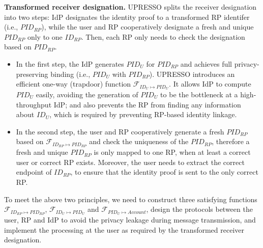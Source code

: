 \vspace{1mm}\noindent \textbf{Transformed receiver designation.}
UPRESSO splits the receiver designation into two steps: IdP designates the identity proof to a transformed RP identifer (i.e., $PID_{RP}$), while the user and RP cooperatively designate a fresh and unique $PID_{RP}$ only to one $ID_{RP}$. Then, each RP only needs to check the designation based on $PID_{RP}$.
\begin{itemize}
  \item In the first step, the IdP generates $PID_U$ for $PID_{RP}$ and achieves full privacy-preserving binding (i.e., $PID_U$ with $PID_{RP}$).
UPRESSO introduces an efficient one-way (trapdoor) function $\mathcal{F}_{ID_{U} \mapsto PID_{U}}$.
 It allows IdP to  compute $PID_U$ easily,  avoiding the generation of $PID_U$ to be the bottleneck at a high-throughput IdP;
   and also prevents the RP from finding any information about $ID_U$, which is required by preventing RP-based identity linkage.
  \item In the second step, the user and RP cooperatively generate a fresh $PID_{RP}$ based on $\mathcal{F}_{ID_{RP} \mapsto PID_{RP}}$ and check the uniqueness of the $PID_{RP}$, therefore a fresh and unique $PID_{RP}$ is only mapped to one RP, when at least a correct user or correct RP exists. Moreover, the user needs to extract the correct endpoint of $ID_{RP}$, to ensure that the  identity proof is sent to the only correct RP.
\end{itemize}

To meet the above two principles, we need to construct three satisfying functions $\mathcal{F}_{ID_{RP} \mapsto PID_{RP}}$, $\mathcal{F}_{ID_{U} \mapsto PID_{U}}$ and $\mathcal{F}_{PID_{U} \mapsto Account}$, design the protocols between the user, RP and IdP to avoid the privacy leakage during message transmission, and implement the  processing at the user as  required by the transformed receiver designation.









